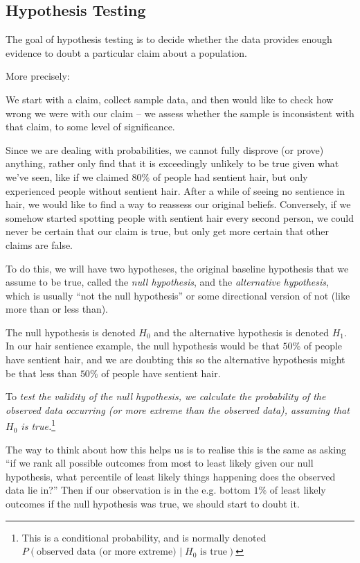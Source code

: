 \subsection{Hypothesis Testing}

The goal of hypothesis testing is to decide whether the data provides enough evidence to doubt a particular claim about a population.

More precisely:

We start with a claim, collect sample data, and then would like to check how wrong we were with our claim -- 
we assess whether the sample is inconsistent with that claim, to some level of significance.

Since we are dealing with probabilities, we cannot fully disprove (or prove) anything, rather only find that it is exceedingly unlikely to be true given what we've seen, like if we claimed $80\%$ of people had sentient hair, but only experienced people without sentient hair. 
After a while of seeing no sentience in hair, we would like to find a way to reassess our original beliefs. Conversely, if we somehow started spotting people with sentient hair every second person, we could never be certain that our claim is true, but only get more certain that other claims are false.

To do this, we will have two hypotheses, the original baseline hypothesis that we assume to be true, called the \emph{null hypothesis}, and the \emph{alternative hypothesis}, which is usually ``not the null hypothesis'' or some directional version of not (like more than or less than).

The null hypothesis is denoted $H_0$ and the alternative hypothesis is denoted $H_1$. In our hair sentience example, the null hypothesis would be that $50\%$ of people have sentient hair, and we are doubting this so the alternative hypothesis might be that less than $50\%$ of people have sentient hair.

To \emph{test the validity of the null hypothesis, we calculate the probability of the observed data occurring (or more extreme than the observed data), assuming that $H_0$ is true.}\footnote{This is a conditional probability, and is normally denoted $P(\text{observed data (or more extreme) } \vert \; H_0 \text{ is true})$}

The way to think about how this helps us is to realise this is the same as asking ``if we rank all possible outcomes from most to least likely given our null hypothesis, what percentile of least likely things happening does the observed data lie in?''
Then if our observation is in the e.g. bottom $1\%$ of least likely outcomes if the null hypothesis was true, we should start to doubt it.

